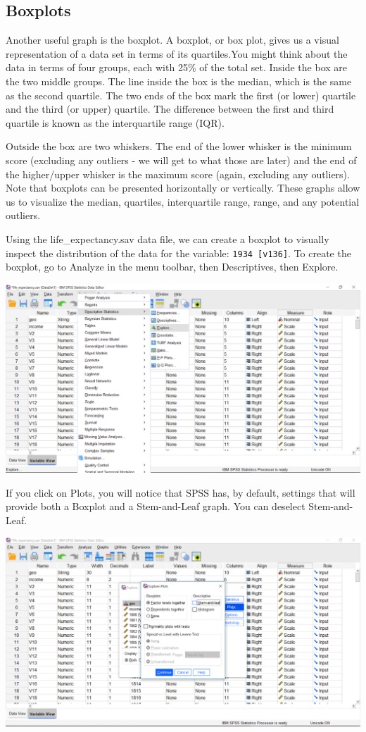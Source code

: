 \documentclass[
]{book}
\begin{document}
\hypertarget{boxplots}{%
\subsection{Boxplots}\label{boxplots}}

Another useful graph is the boxplot. A boxplot, or box plot, gives us a visual representation of a data set in terms of its quartiles.You might think about the data in terms of four groups, each with 25\% of the total set. Inside the box are the two middle groups. The line inside the box is the median, which is the same as the second quartile. The two ends of the box mark the first (or lower) quartile and the third (or upper) quartile. The difference between the first and third quartile is known as the interquartile range (IQR).

Outside the box are two whiskers. The end of the lower whisker is the minimum score (excluding any outliers - we will get to what those are later) and the end of the higher/upper whisker is the maximum score (again, excluding any outliers). Note that boxplots can be presented horizontally or vertically. These graphs allow us to visualize the median, quartiles, interquartile range, range, and any potential outliers.

Using the life\_expectancy.sav data file, we can create a boxplot to visually inspect the distribution of the data for the variable: \texttt{1934\ {[}v136{]}}. To create the boxplot, go to {Analyze} in the menu toolbar, then {Descriptives}, then {Explore}.

\includegraphics{img/2.4.31.png}

If you click on {Plots}, you will notice that SPSS has, by default, settings that will provide both a Boxplot and a Stem-and-Leaf graph. You can deselect {Stem-and-Leaf}.

\includegraphics{img/2.4.32.png}
\end{document}
